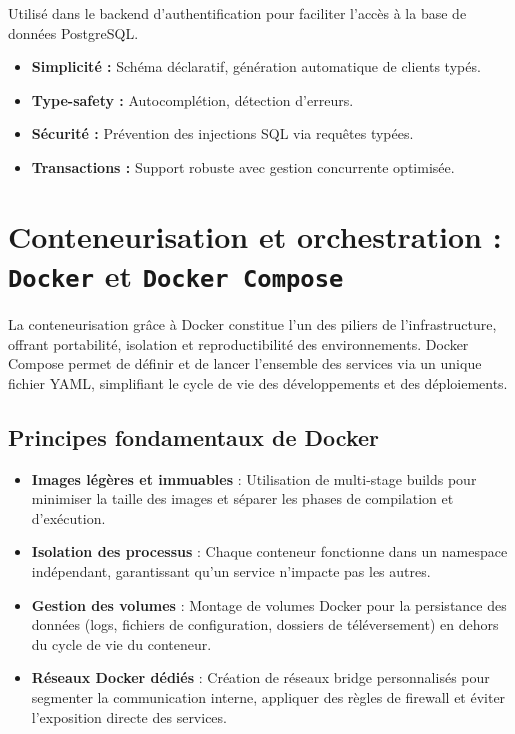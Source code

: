 \documentclass[12pt]{rapportPfe}
\begin{document}
Utilisé dans le backend d’authentification pour faciliter l’accès à la base de données PostgreSQL.

\begin{itemize}
    \item \textbf{Simplicité :} Schéma déclaratif, génération automatique de clients typés.
    \item \textbf{Type-safety :} Autocomplétion, détection d’erreurs.
    \item \textbf{Sécurité :} Prévention des injections SQL via requêtes typées.
    \item \textbf{Transactions :} Support robuste avec gestion concurrente optimisée.
\end{itemize}

\section{Conteneurisation et orchestration : \texttt{Docker} et \texttt{Docker Compose}}

La conteneurisation grâce à Docker constitue l’un des piliers de l’infrastructure, offrant portabilité, isolation et reproductibilité des environnements. Docker Compose permet de définir et de lancer l’ensemble des services via un unique fichier YAML, simplifiant le cycle de vie des développements et des déploiements.

\subsection{Principes fondamentaux de Docker}
\begin{itemize}[itemsep=0.8em]
  \item \textbf{Images légères et immuables} : Utilisation de multi-stage builds pour minimiser la taille des images et séparer les phases de compilation et d’exécution.
  \item \textbf{Isolation des processus} : Chaque conteneur fonctionne dans un namespace indépendant, garantissant qu’un service n’impacte pas les autres.
  \item \textbf{Gestion des volumes} : Montage de volumes Docker pour la persistance des données (logs, fichiers de configuration, dossiers de téléversement) en dehors du cycle de vie du conteneur.
  \item \textbf{Réseaux Docker dédiés} : Création de réseaux bridge personnalisés pour segmenter la communication interne, appliquer des règles de firewall et éviter l’exposition directe des services.
\end{itemize}
\end{document}
